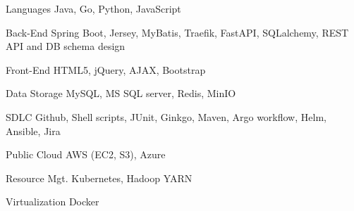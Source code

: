 

\begin{cvskills}

  \cvskill
    {Languages} %
    {Java, Go, Python, JavaScript} %

  \cvskill
    {Back-End} %
    {Spring Boot, Jersey, MyBatis, Traefik, FastAPI, SQLalchemy, REST API and DB schema design} %

  \cvskill
    {Front-End} %
    {HTML5, jQuery, AJAX, Bootstrap} %

  \cvskill
    {Data Storage} %
    {MySQL, MS SQL server, Redis, MinIO} %

  \cvskill
    {SDLC} %
    {Github, Shell scripts, JUnit, Ginkgo, Maven, Argo workflow, Helm, Ansible, Jira} %

  \cvskill
    {Public Cloud} %
    {AWS (EC2, S3), Azure} %

  \cvskill
    {Resource Mgt.} %
    {Kubernetes, Hadoop YARN}

  \cvskill
    {Virtualization} %
    {Docker} %

\end{cvskills}
